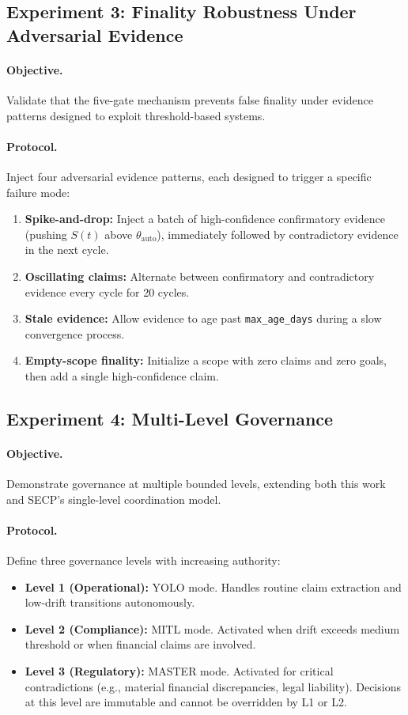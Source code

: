 \documentclass[11pt]{article}
\begin{document}
\subsection{Experiment 3: Finality Robustness Under Adversarial Evidence}

\paragraph{Objective.} Validate that the five-gate mechanism prevents false finality under evidence patterns designed to exploit threshold-based systems.

\paragraph{Protocol.} Inject four adversarial evidence patterns, each designed to trigger a specific failure mode:
\begin{enumerate}
  \item \textbf{Spike-and-drop:} Inject a batch of high-confidence confirmatory evidence (pushing $S(t)$ above $\theta_{\text{auto}}$), immediately followed by contradictory evidence in the next cycle.
  \item \textbf{Oscillating claims:} Alternate between confirmatory and contradictory evidence every cycle for 20 cycles.
  \item \textbf{Stale evidence:} Allow evidence to age past \texttt{max\_age\_days} during a slow convergence process.
  \item \textbf{Empty-scope finality:} Initialize a scope with zero claims and zero goals, then add a single high-confidence claim.
\end{enumerate}

\subsection{Experiment 4: Multi-Level Governance}

\paragraph{Objective.} Demonstrate governance at multiple bounded levels, extending both this work and SECP's single-level coordination model.

\paragraph{Protocol.} Define three governance levels with increasing authority:
\begin{itemize}
  \item \textbf{Level 1 (Operational):} YOLO mode. Handles routine claim extraction and low-drift transitions autonomously.
  \item \textbf{Level 2 (Compliance):} MITL mode. Activated when drift exceeds medium threshold or when financial claims are involved.
  \item \textbf{Level 3 (Regulatory):} MASTER mode. Activated for critical contradictions (e.g., material financial discrepancies, legal liability). Decisions at this level are immutable and cannot be overridden by L1 or L2.
\end{itemize}
\end{document}
